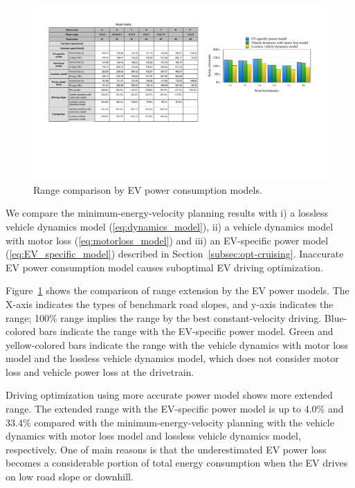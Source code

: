 \documentclass{IEEEtran}
\begin{document}
\begin{figure}	 %
\centering
\includegraphics[width=\hsize]{Figures/model_fidelity.pdf}
\caption{Range comparison by EV power consumption models.}
\label{fig:energy_by_model}
\end{figure} 

We compare the minimum-energy-velocity planning results with i) a lossless vehicle dynamics model (\ref{eq:dynamics_model}), ii) a vehicle dynamics model with motor loss (\ref{eq:motorloss_model}) and iii) an EV-specific power model (\ref{eq:EV_specific_model}) described in Section~\ref{subsec:opt-cruising}. Inaccurate EV power consumption model causes suboptimal EV driving optimization.

Figure~\ref{fig:energy_by_model} shows the comparison of range extension by the EV power models. The X-axis indicates the types of benchmark road slopes, and y-axis indicates the range; 100\%  range implies the range by the best constant-velocity driving. Blue-colored bars indicate the range with the EV-specific power model. Green and yellow-colored bars indicate the range with the vehicle dynamics with motor loss model and the lossless vehicle dynamics model, which does not consider motor loss and vehicle power loss at the drivetrain.

Driving optimization using more accurate power model shows more extended range. The extended range with the EV-specific power model is up to 4.0\% and 33.4\% compared with the minimum-energy-velocity planning with the vehicle dynamics with motor loss model and lossless vehicle dynamics model, respectively. One of main reasons is that the underestimated EV power loss becomes a considerable portion of total energy consumption when the EV drives on low road slope or downhill.
\end{document}
